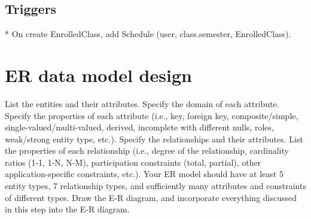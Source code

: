 \documentclass[11pt,oneside,a4paper]{article}
\begin{document}
\subsection{Triggers}
	* On create EnrolledClass,  add Schedule (user, class.semester,
	EnrolledClass). 
		
	
\section{ER data model design}
List the entities and their attributes. Specify the domain of each attribute. Specify the properties of each attribute (i.e., key, foreign key, composite/simple, single-valued/multi-valued, derived, incomplete with different nulls, roles, weak/strong entity type, etc.). Specify the relationships and their attributes. List the properties of each relationship (i.e., degree of the relationship, cardinality ratios (1-1, 1-N, N-M), participation constraints (total, partial), other application-specific constraints, etc.). Your ER model should have at least 5 entity types, 7 relationship types, and sufficiently many attributes and constraints of different types. Draw the E-R diagram, and incorporate everything discussed in this step into the E-R diagram. 
\end{document}
